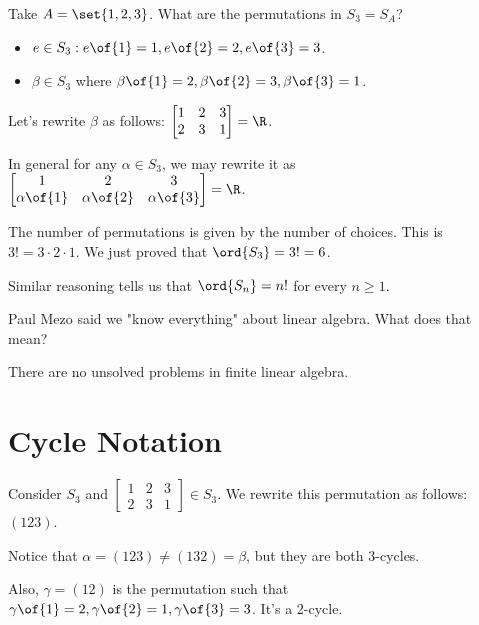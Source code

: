 \begin{example}
    Take $A = \set{1,2,3}$.
    What are the permutations in $S_3 = S_A$?
    \begin{itemize}
        \item $e \in S_3: e\of{1} = 1, e\of{2} = 2, e\of{3} = 3$.
        \item $\beta \in S_3$ where $\beta\of{1} = 2, \beta\of{2} = 3, \beta\of{3} = 1$.
    \end{itemize}
    Let's rewrite $\beta$ as follows: $\begin{bmatrix} 1 & 2 & 3 \\ 2 & 3 & 1 \end{bmatrix} = \R$.

    In general for any $\alpha \in S_3$, we may rewrite it as $\begin{bmatrix} 1 & 2 & 3 \\ \alpha\of{1} & \alpha\of{2} & \alpha\of{3} \end{bmatrix} = \R$.

    The number of permutations is given by the number of choices. This is $3! = 3 \cdot 2 \cdot 1$. We just proved that $\ord{S_3} = 3! = 6$.
    
    Similar reasoning tells us that $\ord{S_n} = n!$ for every $n \geq 1$.
\end{example}

\begin{question}
    Paul Mezo said we "know everything" about linear algebra. What does that mean?
\end{question}
\begin{answer}
    There are no unsolved problems in finite linear algebra.
\end{answer}

\section{Cycle Notation}

Consider $S_3$ and $\begin{bmatrix} 1 & 2 & 3 \\ 2 & 3 & 1 \end{bmatrix} \in S_3$. We rewrite this permutation as follows: $(1 2 3)$.

Notice that $\alpha = (123) \neq (132) = \beta$, but they are both 3-cycles.

Also, $\gamma = (12)$ is the permutation such that $\gamma\of{1} = 2, \gamma\of{2} = 1, \gamma\of{3} = 3$. It's a 2-cycle.

